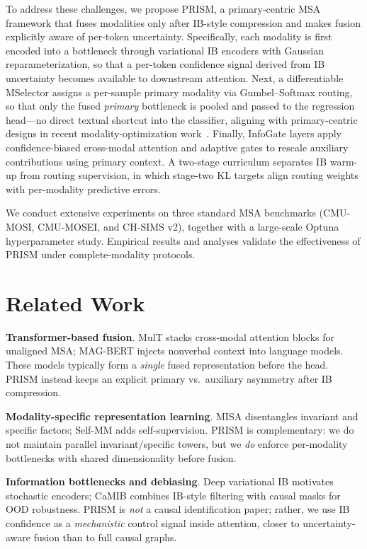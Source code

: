 \documentclass[11pt]{article}
\begin{document}
To address these challenges, we propose PRISM, a primary-centric
MSA framework that fuses modalities only after IB-style compression and makes
fusion explicitly aware of per-token uncertainty.
Specifically, each modality is first encoded into a bottleneck through
variational IB encoders with Gaussian reparameterization, so that a
per-token confidence signal derived from IB uncertainty
becomes available to downstream attention.
Next, a differentiable MSelector assigns a per-sample primary modality
via Gumbel--Softmax routing, so that only the fused \emph{primary} bottleneck
is pooled and passed to the regression head---no direct textual shortcut into
the classifier, aligning with primary-centric designs in recent
modality-optimization work~\citep{yang2025improving}.
Finally, InfoGate layers apply confidence-biased cross-modal attention
and adaptive gates to rescale auxiliary contributions using primary context.
A two-stage curriculum separates IB warm-up from routing supervision, in which
stage-two KL targets align routing weights with per-modality predictive errors.

We conduct extensive experiments on three standard MSA benchmarks (CMU-MOSI,
CMU-MOSEI, and CH-SIMS v2), together with a large-scale Optuna hyperparameter
study. Empirical results and analyses validate the effectiveness of PRISM
under complete-modality protocols.

\section{Related Work}
\label{sec:related}

\noindent \textbf{Transformer-based fusion}.
MulT \citep{tsai2019multimodal} stacks cross-modal attention blocks for unaligned
MSA; MAG-BERT \citep{rahman2020integrating} injects nonverbal context into
language models.
These models typically form a \emph{single} fused representation before the head.
PRISM instead keeps an explicit primary vs.\ auxiliary asymmetry after IB
compression.

\noindent \textbf{Modality-specific representation learning}.
MISA \citep{hazarika2020misa} disentangles invariant and specific factors; Self-MM
\citep{yu2021learning} adds self-supervision.
PRISM is complementary: we do not maintain parallel invariant/specific
towers, but we \emph{do} enforce per-modality bottlenecks with shared
dimensionality before fusion.

\noindent \textbf{Information bottlenecks and debiasing}.
Deep variational IB \citep{alemi2017deep} motivates stochastic encoders; CaMIB
\citep{jiang2025towards} combines IB-style filtering with causal masks for OOD
robustness.
PRISM is \emph{not} a causal identification paper; rather, we use IB
confidence as a \emph{mechanistic} control signal inside attention, closer to
uncertainty-aware fusion than to full causal graphs.
\end{document}
